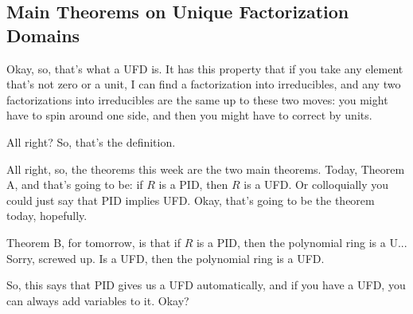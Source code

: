 \subsection{Main Theorems on Unique Factorization Domains}

\begin{speech}[00:15:52 - 00:17:25]
Okay, so, that's what a UFD is. It has this property that if you take any element that's not zero or a unit, I can find a factorization into irreducibles, and any two factorizations into irreducibles are the same up to these two moves: you might have to spin around one side, and then you might have to correct by units.

All right? So, that's the definition.

All right, so, the theorems this week are the two main theorems. Today, Theorem A,  and that's going to be: if $R$ is a PID,  then $R$ is a UFD.  Or colloquially you could just say that  PID implies UFD. Okay, that's going to be the theorem today, hopefully.

Theorem B, for tomorrow,  is that if $R$ is a PID, then the polynomial ring is a U... Sorry, screwed up.  Is a UFD, then the polynomial ring is a UFD. 

So, this says that PID gives us a UFD automatically, and if you have a UFD, you can always add variables to it. Okay?
\end{speech}

